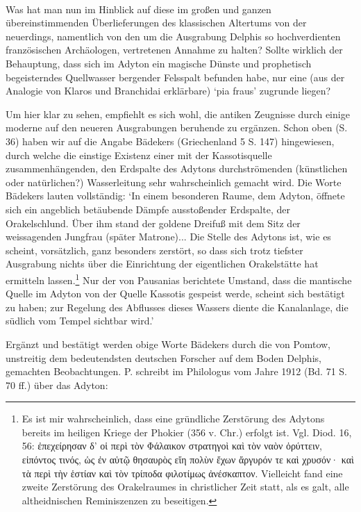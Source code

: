 \documentclass[a4paper, 11pt, oneside]{article}
\begin{document}
\paragraph{}
Was hat man nun im Hinblick auf diese im großen und ganzen übereinstimmenden Überlieferungen des klassischen Altertums von der neuerdings, namentlich von den um die Ausgrabung Delphis so hochverdienten französischen Archäologen, vertretenen Annahme zu halten? Sollte wirklich der Behauptung, dass sich im Adyton ein magische Dünste und prophetisch begeisterndes Quellwasser bergender Felsspalt befunden habe, nur eine (aus der Analogie von Klaros und Branchidai erklärbare) `pia fraus' zugrunde liegen?

Um hier klar zu sehen, empfiehlt es sich wohl, die antiken Zeugnisse durch einige moderne auf den neueren Ausgrabungen beruhende zu ergänzen. Schon oben (S. 36) haben wir auf die Angabe Bädekers (Griechenland 5 S. 147) hingewiesen, durch welche die einstige Existenz einer mit der Kassotisquelle zusammenhängenden, den Erdspalte des Adytons durchströmenden (künstlichen oder natürlichen?) Wasserleitung sehr wahrscheinlich gemacht wird. Die Worte Bädekers lauten vollständig: `In einem besonderen Raume, dem Adyton, öffnete sich ein angeblich betäubende Dämpfe ausstoßender Erdspalte, der Orakelschlund. Über ihm stand der goldene Dreifuß mit dem Sitz der weissagenden Jungfrau (später Matrone)... Die Stelle des Adytons ist, wie es scheint, vorsätzlich, ganz besonders zerstört, so dass sich trotz tiefster Ausgrabung nichts über die Einrichtung der eigentlichen Orakelstätte hat ermitteln lassen.\footnote{Es ist mir wahrscheinlich, dass eine gründliche Zerstörung des Adytons bereits im heiligen Kriege der Phokier (356 v. Chr.) erfolgt ist. Vgl. Diod. 16, 56: ἐπεχείρησαν δ' οἱ περὶ τὸν Φάλαικον στρατηγοὶ καὶ τὸν ναὸν ὀρύττειν, εἰπόντος τινός, ὡς ἐν αὐτῷ θησαυρὸς εἴη πολὺν ἔχων ἄργυρόν τε καὶ χρυσόν· καὶ τὰ περὶ τὴν ἑστίαν καὶ τὸν τρίποδα φιλοτίμως ἀνέσκαπτον. Vielleicht fand eine zweite Zerstörung des Orakelraumes in christlicher Zeit statt, als es galt, alle altheidnischen Reminiszenzen zu beseitigen.} Nur der von Pausanias berichtete Umstand, dass die mantische Quelle im Adyton von der Quelle Kassotis gespeist werde, scheint sich bestätigt zu haben; zur Regelung des Abflusses dieses Wassers diente die Kanalanlage, die südlich vom Tempel sichtbar wird.'

Ergänzt und bestätigt werden obige Worte Bädekers durch die von Pomtow, unstreitig dem bedeutendsten deutschen Forscher auf dem Boden Delphis, gemachten Beobachtungen. P. schreibt im Philologus vom Jahre 1912 (Bd. 71 S. 70 ff.) über das Adyton:
\end{document}

